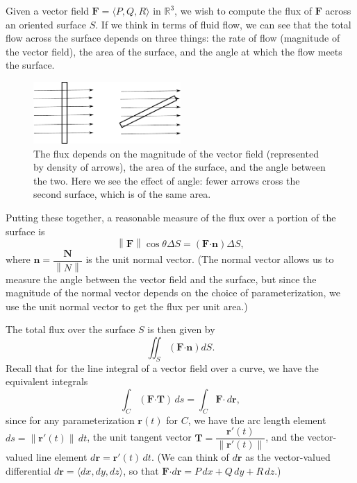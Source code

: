 \documentclass[12pt,letterpaper]{article}
\newcommand{\dotp}{\boldsymbol{\cdot}}
\newcommand{\R}{\mathbb{R}}
\renewcommand{\r}{\mathbf{r}}
\newcommand{\F}{\mathbf{F}}
\newcommand{\N}{\mathbf{N}}
\newcommand{\len}[1]{\left\lVert #1\right\rVert}
\begin{document}
Given a vector field $\F = \langle P,Q,R\rangle$ in $\R^3$, we wish to compute the flux of $\F$ across an oriented surface $S$. If we think in terms of fluid flow, we can see that the total flow across the surface depends on three things: the rate of flow (magnitude of the vector field), the area of the surface, and the angle at which the flow meets the surface.
\begin{figure}[h]
 \begin{center}
  \includegraphics[width=0.5\textwidth]{flux}
 \end{center}
\caption{The flux depends on the magnitude of the vector field (represented by density of arrows), the area of the surface, and the angle between the two. Here we see the effect of angle: fewer arrows cross the second surface, which is of the same area.}
\end{figure}
Putting these together, a reasonable measure of the flux over a portion of the surface is
\[
 \len{\F}\cos\theta \Delta S = (\F\dotp \mathbf{n}) \Delta S,
\]
where $\mathbf{n} = \dfrac{\N}{\len{N}}$ is the unit normal vector. (The normal vector allows us to measure the angle between the vector field and the surface, but since the magnitude of the normal vector depends on the choice of parameterization, we use the unit normal vector to get the flux per unit area.)

The total flux over the surface $S$ is then given by
\[
 \iint_S (\F\dotp\mathbf{n}) dS.
\]
Recall that for the line integral of a vector field over a curve, we have the equivalent integrals
\[
 \int_C (\F\dotp \mathbf{T})\,ds = \int_C \F\dotp \,d\r,
\]
since for any parameterization $\r(t)$ for $C$, we have the arc length element $ds = \len{\r'(t)}\,dt$, the unit tangent vector $\mathbf{T}=\dfrac{\r'(t)}{\len{\r'(t)}}$, and the vector-valued line element $d\r = \r'(t)\,dt$. (We can think of $d\r$ as the vector-valued differential $d\r = \langle dx, dy, dz\rangle$, so that $\F\dotp d\r = P\,dx+Q\,dy+R\,dz$.)
\end{document}
